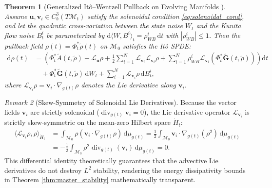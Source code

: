\documentclass[11pt,a4paper,reqno]{article}
\newtheorem{theorem}{Theorem}[section]
\theoremstyle{definition}
\theoremstyle{remark}
\newtheorem{remark}[theorem]{Remark}
\begin{document}
\begin{theorem}[Generalized It\^o--Wentzell Pullback on Evolving Manifolds \cite{ananda2026stochastic_fluid_v2, krylov2011ito}]\label{thm:ito_wentzell}
Assume $\mathbf{u}, \mathbf{v}_i \in C_b^3(T\mathcal{M}_t)$ satisfy the solenoidal condition \eqref{eq:solenoidal_cond}, and let the quadratic cross-variation between the state noise $W_t$ and the Kunita flow noise $B_t^i$ be parameterized by $\mathrm{d}\langle W, B^i \rangle_t = \rho_{WB}^i\,\mathrm{d}t$ with $|\rho_{WB}^i| \le 1$. Then the pullback field $\rho(t) = \Phi_t^*\tilde{\rho}(t)$ on $\mathcal{M}_0$ satisfies the It\^o SPDE:
\begin{align}\label{eq:ito_wentzell_pullback}
  \mathrm{d}\rho(t) &= \left( \Phi_t^* \tilde{A}(t, \tilde{\rho}) + \mathcal{L}_{\mathbf{u}} \rho + \frac{1}{2} \sum_{i=1}^N \mathcal{L}_{\mathbf{v}_i} \mathcal{L}_{\mathbf{v}_i} \rho + \sum_{i=1}^N \rho_{WB}^i \mathcal{L}_{\mathbf{v}_i} \left(\Phi_t^* \tilde{\mathbf{G}}(t, \tilde{\rho})\right) \right) \mathrm{d}t \nonumber \\
  &\quad + \Phi_t^* \tilde{\mathbf{G}}(t, \tilde{\rho})\,\mathrm{d}W_t + \sum_{i=1}^N \mathcal{L}_{\mathbf{v}_i} \rho \,\mathrm{d}B_t^i,
\end{align}
where $\mathcal{L}_{\mathbf{v}_i}\rho = \mathbf{v}_i \cdot \nabla_{g(t)}\rho$ denotes the Lie derivative along $\mathbf{v}_i$.
\end{theorem}

\begin{remark}[Skew-Symmetry of Solenoidal Lie Derivatives]\label{rem:skew_symmetry}
Because the vector fields $\mathbf{v}_i$ are strictly solenoidal ($\operatorname{div}_{g(t)} \mathbf{v}_i = 0$), the Lie derivative operator $\mathcal{L}_{\mathbf{v}_i}$ is strictly skew-symmetric on the mean-zero Hilbert space $\dot{H}_t$:
\begin{align}\label{eq:skew_symmetry}
  \langle \mathcal{L}_{\mathbf{v}_i} \rho, \rho \rangle_{\dot{H}_t}
  &= \int_{\mathcal{M}_0} \rho (\mathbf{v}_i \cdot \nabla_{g(t)} \rho) \,\mathrm{d}\mu_{g(t)}
   = \frac{1}{2} \int_{\mathcal{M}_0} \mathbf{v}_i \cdot \nabla_{g(t)} (\rho^2) \,\mathrm{d}\mu_{g(t)} \nonumber \\
  &= -\frac{1}{2} \int_{\mathcal{M}_0} \rho^2 \operatorname{div}_{g(t)}(\mathbf{v}_i) \,\mathrm{d}\mu_{g(t)} = 0.
\end{align}
This differential identity theoretically guarantees that the advective Lie derivatives do not destroy $L^2$ stability, rendering the energy dissipativity bounds in Theorem \ref{thm:master_stability} mathematically transparent.
\end{remark}
\end{document}

